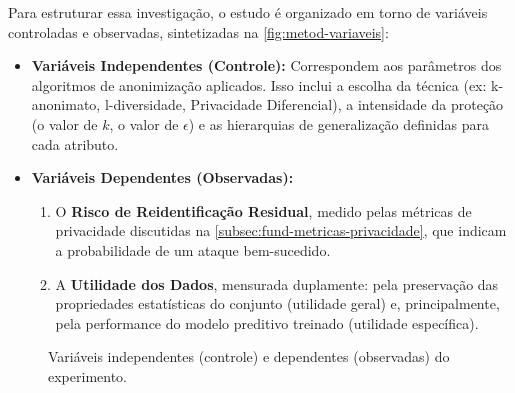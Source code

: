 Para estruturar essa investigação, o estudo é organizado em torno de variáveis controladas e observadas, sintetizadas na \autoref{fig:metod-variaveis}:

\begin{itemize}
    \item \textbf{Variáveis Independentes (Controle):} Correspondem aos parâmetros dos algoritmos de anonimização aplicados. Isso inclui a escolha da técnica (ex: k-anonimato, l-diversidade, Privacidade Diferencial), a intensidade da proteção (o valor de $k$, o valor de $\epsilon$) e as hierarquias de generalização definidas para cada atributo.
    \item \textbf{Variáveis Dependentes (Observadas):}
    \begin{enumerate}
        \item O \textbf{Risco de Reidentificação Residual}, medido pelas métricas de privacidade discutidas na \autoref{subsec:fund-metricas-privacidade}, que indicam a probabilidade de um ataque bem-sucedido.
        \item A \textbf{Utilidade dos Dados}, mensurada duplamente: pela preservação das propriedades estatísticas do conjunto (utilidade geral) e, principalmente, pela performance do modelo preditivo treinado (utilidade específica).
    \end{enumerate}
\end{itemize}

\begin{figure}[H]
\centering
\caption{Variáveis independentes (controle) e dependentes (observadas) do experimento.}
\label{fig:metod-variaveis}
\end{figure}

